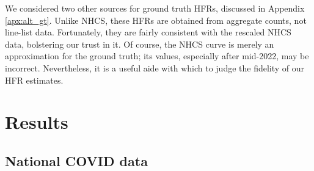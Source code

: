 \documentclass{article}
\begin{document}



We considered two other sources for ground truth HFRs, discussed in Appendix \ref{apx:alt_gt}. Unlike NHCS, these HFRs are obtained from aggregate counts, not line-list data. Fortunately, they are fairly consistent with the rescaled NHCS data, bolstering our trust in it. Of course, the NHCS curve is merely an approximation for the ground truth; its values, especially after mid-2022, may be incorrect. Nevertheless, it is a useful aide with which to judge the fidelity of our HFR estimates.

\section{Results}\label{sec:results}

\subsection{National COVID data}\label{sec:results_real}

\end{document}
